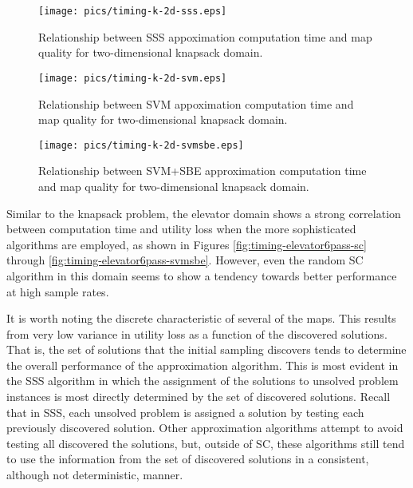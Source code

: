 \begin{figure}
\begin{center}
\texttt{[image: pics/timing-k-2d-sss.eps]}
\caption{Relationship between SSS appoximation computation time and map quality for two-dimensional knapsack domain.}
\label{fig:timing-k-2d-sss}
\end{center}
\end{figure}


\begin{figure}
\begin{center}
\texttt{[image: pics/timing-k-2d-svm.eps]}
\caption{Relationship between SVM appoximation computation time and map quality for two-dimensional knapsack domain.}
\label{fig:timing-k-2d-svm}
\end{center}
\end{figure}

\begin{figure}
\begin{center}
\texttt{[image: pics/timing-k-2d-svmsbe.eps]}
\caption{Relationship between SVM+SBE approximation computation time and map quality for two-dimensional knapsack domain.}
\label{fig:timing-k-2d-svmsbe}
\end{center}
\end{figure}

Similar to the knapsack problem,  the elevator domain shows a strong correlation between computation time and utility loss when the more sophisticated algorithms are employed, as shown in Figures \ref{fig:timing-elevator6pass-sc} through \ref{fig:timing-elevator6pass-svmsbe}.  However, even the random SC algorithm in this domain seems to show a tendency towards better performance at high sample rates.


It is worth noting the discrete characteristic of several of the maps.  This results from very low variance in utility loss as a function of the discovered solutions.  That is, the set of solutions that the initial sampling discovers tends to determine the overall performance of the approximation algorithm.  This is most evident in the SSS algorithm in which the assignment of the solutions to unsolved problem instances is most directly determined by the set of discovered solutions.  Recall that in SSS, each unsolved problem is assigned a solution by testing each previously discovered solution.  Other approximation algorithms attempt to avoid testing all discovered  the solutions, but, outside of SC, these algorithms still tend to use the information from the set of discovered solutions in a consistent, although not deterministic, manner.

